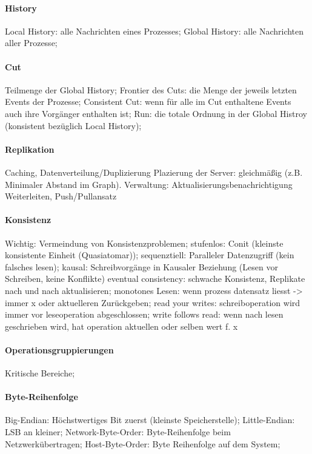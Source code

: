 \documentclass[pagesize,11pt,a4paper]{scrartcl}
\begin{document}
\paragraph*{History}
	Local History: alle Nachrichten eines Prozesses;
	Global History: alle Nachrichten aller Prozesse;
	
\paragraph*{Cut}
	Teilmenge der Global History;
	Frontier des Cuts: die Menge der jeweils letzten Events der Prozesse;
	Consistent Cut: wenn für alle im Cut enthaltene Events auch ihre Vorgänger enthalten ist;
	Run: die totale Ordnung in der Global Histroy (konsistent bezüglich Local History);

\paragraph*{Replikation}
	Caching, Datenverteilung/Duplizierung
	Plazierung der Server: gleichmäßig (z.B. Minimaler Abstand im Graph).
	Verwaltung: Aktualisierungsbenachrichtigung Weiterleiten, Push/Pullansatz

\paragraph*{Konsistenz}
	Wichtig: Vermeindung von Konsistenzproblemen;
	stufenlos: Conit (kleinste konsistente Einheit (Quasiatomar));
	sequenztiell: Paralleler Datenzugriff (kein falsches lesen);
	kausal: Schreibvorgänge in Kausaler Beziehung (Lesen vor Schreiben, keine Konflikte)
	eventual consistency: schwache Konsistenz, Replikate nach und nach aktualisieren;
	monotones Lesen: wenn prozess datensatz liesst -> immer x oder aktuelleren Zurückgeben;
	read your writes: schreiboperation wird immer vor leseoperation abgeschlossen;
	write follows read: wenn nach lesen geschrieben wird, hat operation aktuellen oder selben wert f. x

\paragraph*{Operationsgruppierungen}
	Kritische Bereiche;

\paragraph*{Byte-Reihenfolge}
	Big-Endian: Höchstwertiges Bit zuerst (kleinste Speicherstelle);
	Little-Endian: LSB an kleiner;
	Network-Byte-Order: Byte-Reihenfolge beim Netzwerkübertragen;
	Host-Byte-Order: Byte Reihenfolge auf dem System;
\end{document}
